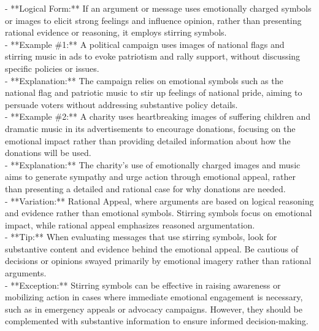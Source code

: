 \documentclass[a4paper,12pt,single,pdftex]{scrartcl}
\begin{document}
    
      - **Logical Form:** If an argument or message uses emotionally charged symbols or images to elicit strong feelings and influence opinion, rather than presenting rational evidence or reasoning, it employs stirring symbols.
    \\

    
      - **Example \#1:** A political campaign uses images of national flags and stirring music in ads to evoke patriotism and rally support, without discussing specific policies or issues.
    \\

    
      - **Explanation:** The campaign relies on emotional symbols such as the national flag and patriotic music to stir up feelings of national pride, aiming to persuade voters without addressing substantive policy details.
    \\

    
      - **Example \#2:** A charity uses heartbreaking images of suffering children and dramatic music in its advertisements to encourage donations, focusing on the emotional impact rather than providing detailed information about how the donations will be used.
    \\

    
      - **Explanation:** The charity's use of emotionally charged images and music aims to generate sympathy and urge action through emotional appeal, rather than presenting a detailed and rational case for why donations are needed.
    \\

    
      - **Variation:** Rational Appeal, where arguments are based on logical reasoning and evidence rather than emotional symbols. Stirring symbols focus on emotional impact, while rational appeal emphasizes reasoned argumentation.
    \\

    
      - **Tip:** When evaluating messages that use stirring symbols, look for substantive content and evidence behind the emotional appeal. Be cautious of decisions or opinions swayed primarily by emotional imagery rather than rational arguments.
    \\

    
      - **Exception:** Stirring symbols can be effective in raising awareness or mobilizing action in cases where immediate emotional engagement is necessary, such as in emergency appeals or advocacy campaigns. However, they should be complemented with substantive information to ensure informed decision-making.
    \\
\end{document}
